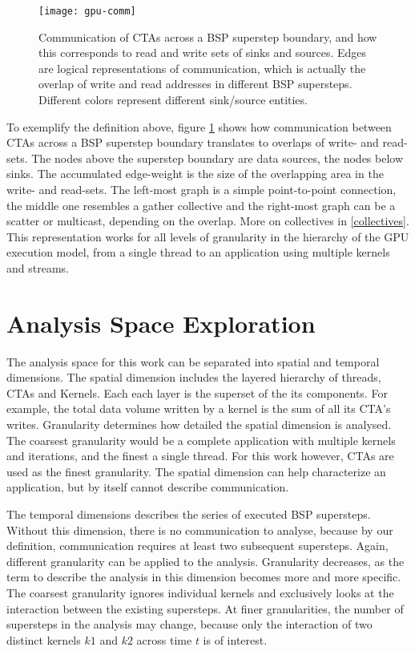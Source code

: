 \begin{figure}[t]
	\centering
	\texttt{[image: gpu-comm]}
	\caption{Communication of CTAs across a BSP superstep boundary, and how this corresponds to read and write sets 
	of sinks and sources. Edges are logical representations of communication, which is actually the overlap of write and read addresses in different BSP supersteps. Different colors represent different sink/source entities.}
	\label{gpu-comm}
\end{figure} 
To exemplify the definition above, figure \ref{gpu-comm} shows how communication between CTAs across a 
BSP superstep boundary translates to overlaps of write- and read-sets. The nodes above the superstep boundary are data sources, the nodes below sinks. The accumulated edge-weight is the size of the 
overlapping area in the write- and read-sets. The left-most graph is a simple point-to-point connection, the middle one resembles a gather collective and the right-most graph can be a scatter or multicast, depending on the overlap. More on collectives in \ref{collectives}.
This representation works for all levels of granularity in the hierarchy of the GPU execution model, from a single thread to an application using multiple kernels and streams.

\section{Analysis Space Exploration}

The analysis space for this work can be separated into spatial and temporal dimensions. The spatial dimension includes the layered hierarchy of threads, CTAs and Kernels. Each each layer is the superset of the its components. For example, the total data volume written by a kernel is the sum of all its CTA's writes. 
Granularity determines how detailed the spatial dimension is analysed.
The coarsest granularity would be a complete application with multiple kernels and iterations, and the finest a single thread. For this work however, CTAs are used as the finest granularity. The spatial dimension can help characterize an application, but by itself cannot describe communication.

The temporal dimensions describes the series of executed BSP supersteps. Without this dimension, there is no communication to analyse, because by our definition, communication requires at least two subsequent supersteps.
Again, different granularity can be applied to the analysis. Granularity decreases, as the term to describe the analysis in this dimension becomes more and more specific. The coarsest granularity ignores individual kernels and exclusively looks at the interaction between the existing supersteps. At finer granularities, the number of supersteps in the analysis may change, because only the interaction of two distinct kernels $k1$ and $k2$ across time $t$ is of interest.

